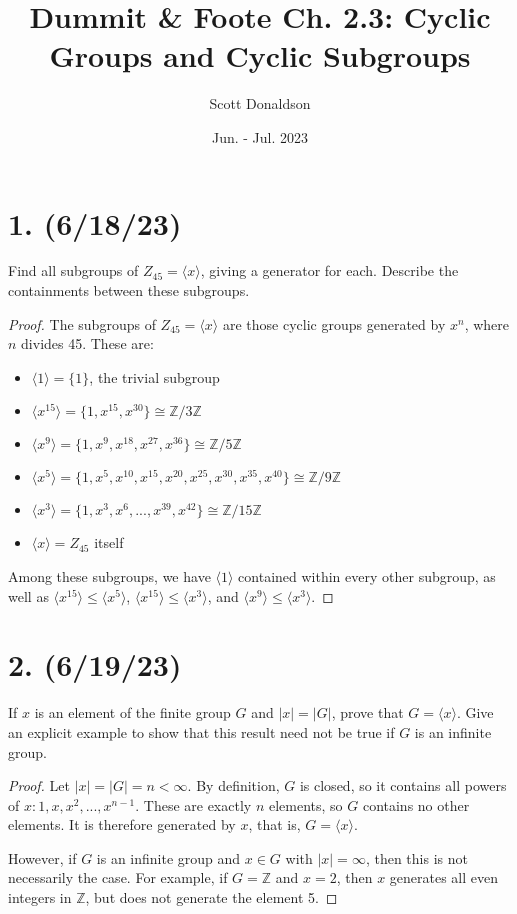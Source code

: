 \documentclass{article}
\title{Dummit \& Foote Ch. 2.3: Cyclic Groups and Cyclic Subgroups}
\author{Scott Donaldson}
\date{Jun. - Jul. 2023}
\begin{document}
\maketitle

\section*{1. (6/18/23)}

Find all subgroups of $Z_{45} = \langle x \rangle$, giving a generator for each. Describe the containments between these subgroups.

\begin{proof}
    The subgroups of $Z_{45} = \langle x \rangle$ are those cyclic groups generated by $x^n$, where $n$ divides 45. These are:
    \begin{itemize}[itemsep=0em]
        \item $\langle 1 \rangle = \{ 1 \}$, the trivial subgroup
        \item $\langle x^{15} \rangle = \{ 1, x^{15}, x^{30} \} \cong \mathbb{Z}/3\mathbb{Z}$
        \item $\langle x^9 \rangle = \{ 1, x^9, x^{18}, x^{27}, x^{36} \} \cong \mathbb{Z}/5\mathbb{Z}$
        \item $\langle x^5 \rangle = \{ 1, x^5, x^{10}, x^{15}, x^{20}, x^{25}, x^{30}, x^{35}, x^{40} \} \cong \mathbb{Z}/9\mathbb{Z}$
        \item $\langle x^3 \rangle = \{ 1, x^3, x^6, ..., x^{39}, x^{42} \} \cong \mathbb{Z}/15\mathbb{Z}$
        \item $\langle x \rangle = Z_{45}$ itself
    \end{itemize}
    Among these subgroups, we have $\langle 1 \rangle$ contained within every other subgroup, as well as $\langle x^{15} \rangle \leq \langle x^5 \rangle$, $\langle x^{15} \rangle \leq \langle x^3 \rangle$, and $\langle x^9 \rangle \leq \langle x^3 \rangle$.
\end{proof}

\section*{2. (6/19/23)}

If $x$ is an element of the finite group $G$ and $|x| = |G|$, prove that $G = \langle x \rangle$. Give an explicit example to show that this result need not be true if $G$ is an infinite group.

\begin{proof}
    Let $|x| = |G| = n < \infty$. By definition, $G$ is closed, so it contains all powers of $x: 1, x, x^2, ..., x^{n - 1}$. These are exactly $n$ elements, so $G$ contains no other elements. It is therefore generated by $x$, that is, $G = \langle x \rangle$.

    However, if $G$ is an infinite group and $x \in G$ with $|x| = \infty$, then this is not necessarily the case. For example, if $G = \mathbb{Z}$ and $x = 2$, then $x$ generates all even integers in $\mathbb{Z}$, but does not generate the element 5.
\end{proof}
\end{document}
